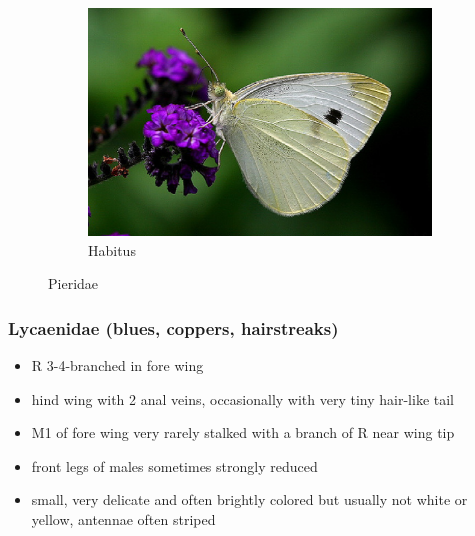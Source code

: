 \documentclass[letterpaper, 11pt]{article}
\begin{document}
\begin{figure}[ht!]
\begin{subfigure}[ht!]{0.5\textwidth}
        \includegraphics[width=\textwidth]{image11}
        \caption{Habitus}
        \label{fig:pierid2}
    \end{subfigure}
    \caption{Pieridae}\label{fig:pierids}
\end{figure}

\subsubsection{Lycaenidae (blues, coppers, hairstreaks)}
\begin{itemize}
\item R 3-4-branched in fore wing
\item hind wing with 2 anal veins, occasionally with very tiny hair-like tail
\item M1 of fore wing very rarely stalked with a branch of R near wing tip
\item front legs of males sometimes strongly reduced
\item small, very delicate and often brightly colored but usually not white or yellow, antennae often striped
\end{itemize}
\end{document}
